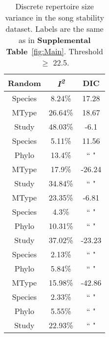 \documentclass{article}
\begin{document}
  \begin{table}[H]
  \centering
  \caption{Discrete repertoire size variance in the song stability dataset. Labels are the same as in \textbf{Supplemental Table}~\ref{fig:Main}. Threshold $\ge$ 22.5.} 
  \begin{tabular}{ccc}
  \hline
  Random & \textit{I\textsuperscript{2}} & DIC \\ 
  \hline
  Species & 8.24\% & 17.28 \\ \hdashline
  MType & 26.64\% & 18.67 \\ \hdashline
  Study & 48.03\% & -6.1 \\ \hdashline
  Species & 5.11\% & 11.56 \\ 
  Phylo & 13.4\% & `` " \\ \hdashline
  MType & 17.9\% & -26.24 \\ 
  Study & 34.84\% & `` " \\ \hdashline
  MType & 23.35\% & -6.81 \\ 
  Species & 4.3\% & `` " \\ 
  Phylo & 10.31\% & `` " \\ \hdashline
  Study & 37.02\% & -23.23 \\ 
  Species & 2.13\% & `` " \\ 
  Phylo & 5.84\% & `` " \\ \hdashline
  MType & 15.98\% & -42.86 \\ 
  Species & 2.33\% & `` " \\ 
  Phylo & 5.55\% & `` " \\ 
  Study & 22.93\% & `` " \\  
  \hline
  \end{tabular}
  \end{table}
\end{document}
